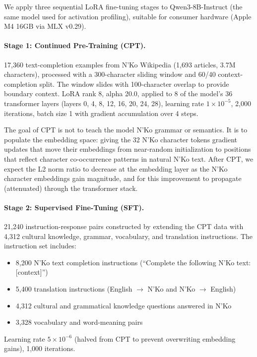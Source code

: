 \documentclass[11pt]{article}
\begin{document}
We apply three sequential LoRA fine-tuning stages to Qwen3-8B-Instruct (the same model used for activation profiling), suitable for consumer hardware (Apple M4 16GB via MLX v0.29).

\paragraph{Stage 1: Continued Pre-Training (CPT).}
17,360 text-completion examples from N'Ko Wikipedia (1,693 articles, 3.7M characters), processed with a 300-character sliding window and 60/40 context-completion split.
The window slides with 100-character overlap to provide boundary context.
LoRA rank 8, alpha 20.0, applied to 8 of the model's 36 transformer layers (layers 0, 4, 8, 12, 16, 20, 24, 28), learning rate $1 \times 10^{-5}$, 2,000 iterations, batch size 1 with gradient accumulation over 4 steps.

The goal of CPT is not to teach the model N'Ko grammar or semantics.
It is to populate the embedding space: giving the 32 N'Ko character tokens gradient updates that move their embeddings from near-random initialization to positions that reflect character co-occurrence patterns in natural N'Ko text.
After CPT, we expect the L2 norm ratio to decrease at the embedding layer as the N'Ko character embeddings gain magnitude, and for this improvement to propagate (attenuated) through the transformer stack.

\paragraph{Stage 2: Supervised Fine-Tuning (SFT).}
21,240 instruction-response pairs constructed by extending the CPT data with 4,312 cultural knowledge, grammar, vocabulary, and translation instructions.
The instruction set includes:
\begin{itemize}
\item 8,200 N'Ko text completion instructions (``Complete the following N'Ko text: [context]'')
\item 5,400 translation instructions (English $\to$ N'Ko and N'Ko $\to$ English)
\item 4,312 cultural and grammatical knowledge questions answered in N'Ko
\item 3,328 vocabulary and word-meaning pairs
\end{itemize}
Learning rate $5 \times 10^{-6}$ (halved from CPT to prevent overwriting embedding gains), 1,000 iterations.
\end{document}
